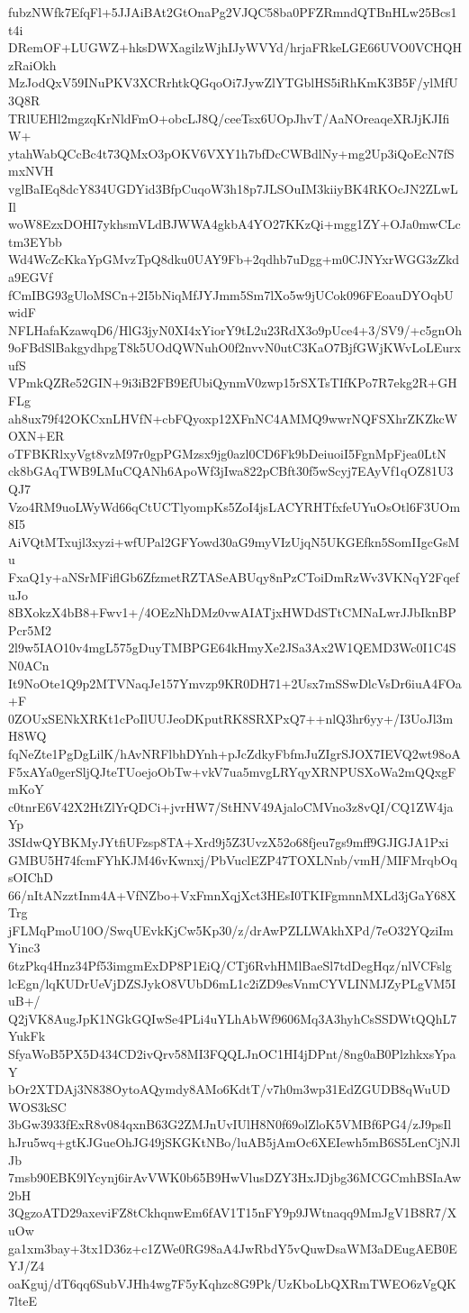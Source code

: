 fubzNWfk7EfqFl+5JJAiBAt2GtOnaPg2VJQC58ba0PFZRmndQTBnHLw25Bcs1t4i
DRemOF+LUGWZ+hksDWXagilzWjhIJyWVYd/hrjaFRkeLGE66UVO0VCHQHzRaiOkh
MzJodQxV59INuPKV3XCRrhtkQGqoOi7JywZlYTGblHS5iRhKmK3B5F/ylMfU3Q8R
TRlUEHl2mgzqKrNldFmO+obcLJ8Q/ceeTsx6UOpJhvT/AaNOreaqeXRJjKJIfiW+
ytahWabQCcBc4t73QMxO3pOKV6VXY1h7bfDcCWBdlNy+mg2Up3iQoEcN7fSmxNVH
vglBaIEq8dcY834UGDYid3BfpCuqoW3h18p7JLSOuIM3kiiyBK4RKOcJN2ZLwLIl
woW8EzxDOHI7ykhsmVLdBJWWA4gkbA4YO27KKzQi+mgg1ZY+OJa0mwCLctm3EYbb
Wd4WcZcKkaYpGMvzTpQ8dku0UAY9Fb+2qdhb7uDgg+m0CJNYxrWGG3zZkda9EGVf
fCmIBG93gUloMSCn+2I5bNiqMfJYJmm5Sm7lXo5w9jUCok096FEoauDYOqbUwidF
NFLHafaKzawqD6/HlG3jyN0XI4xYiorY9tL2u23RdX3o9pUce4+3/SV9/+c5gnOh
9oFBdSlBakgydhpgT8k5UOdQWNuhO0f2nvvN0utC3KaO7BjfGWjKWvLoLEurxufS
VPmkQZRe52GIN+9i3iB2FB9EfUbiQynmV0zwp15rSXTsTIfKPo7R7ekg2R+GHFLg
ah8ux79f42OKCxnLHVfN+cbFQyoxp12XFnNC4AMMQ9wwrNQFSXhrZKZkcWOXN+ER
oTFBKRlxyVgt8vzM97r0gpPGMzsx9jg0azl0CD6Fk9bDeiuoiI5FgnMpFjea0LtN
ck8bGAqTWB9LMuCQANh6ApoWf3jIwa822pCBft30f5wScyj7EAyVf1qOZ81U3QJ7
Vzo4RM9uoLWyWd66qCtUCTlyompKs5ZoI4jsLACYRHTfxfeUYuOsOtl6F3UOm8I5
AiVQtMTxujl3xyzi+wfUPal2GFYowd30aG9myVIzUjqN5UKGEfkn5SomIIgcGsMu
FxaQ1y+aNSrMFiflGb6ZfzmetRZTASeABUqy8nPzCToiDmRzWv3VKNqY2FqefuJo
8BXokzX4bB8+Fwv1+/4OEzNhDMz0vwAIATjxHWDdSTtCMNaLwrJJbIknBPPcr5M2
2l9w5IAO10v4mgL575gDuyTMBPGE64kHmyXe2JSa3Ax2W1QEMD3Wc0I1C4SN0ACn
It9NoOte1Q9p2MTVNaqJe157Ymvzp9KR0DH71+2Usx7mSSwDlcVsDr6iuA4FOa+F
0ZOUxSENkXRKt1cPoIlUUJeoDKputRK8SRXPxQ7++nlQ3hr6yy+/I3UoJl3mH8WQ
fqNeZte1PgDgLilK/hAvNRFlbhDYnh+pJcZdkyFbfmJuZIgrSJOX7IEVQ2wt98oA
F5xAYa0gerSljQJteTUoejoObTw+vkV7ua5mvgLRYqyXRNPUSXoWa2mQQxgFmKoY
c0tnrE6V42X2HtZlYrQDCi+jvrHW7/StHNV49AjaloCMVno3z8vQI/CQ1ZW4jaYp
3SIdwQYBKMyJYtfiUFzsp8TA+Xrd9j5Z3UvzX52o68fjeu7gs9mff9GJIGJA1Pxi
GMBU5H74fcmFYhKJM46vKwnxj/PbVuclEZP47TOXLNnb/vmH/MIFMrqbOqsOIChD
66/nItANzztInm4A+VfNZbo+VxFmnXqjXct3HEsI0TKIFgmnnMXLd3jGaY68XTrg
jFLMqPmoU10O/SwqUEvkKjCw5Kp30/z/drAwPZLLWAkhXPd/7eO32YQziImYinc3
6tzPkq4Hnz34Pf53imgmExDP8P1EiQ/CTj6RvhHMlBaeSl7tdDegHqz/nlVCFslg
lcEgn/lqKUDrUeVjDZSJykO8VUbD6mL1c2iZD9esVnmCYVLINMJZyPLgVM5IuB+/
Q2jVK8AugJpK1NGkGQIwSe4PLi4uYLhAbWf9606Mq3A3hyhCsSSDWtQQhL7YukFk
SfyaWoB5PX5D434CD2ivQrv58MI3FQQLJnOC1HI4jDPnt/8ng0aB0PlzhkxsYpaY
bOr2XTDAj3N838OytoAQymdy8AMo6KdtT/v7h0m3wp31EdZGUDB8qWuUDWOS3kSC
3bGw3933fExR8v084qxnB63G2ZMJnUvIUlH8N0f69olZloK5VMBf6PG4/zJ9psIl
hJru5wq+gtKJGueOhJG49jSKGKtNBo/luAB5jAmOc6XEIewh5mB6S5LenCjNJlJb
7msb90EBK9lYcynj6irAvVWK0b65B9HwVlusDZY3HxJDjbg36MCGCmhBSIaAw2bH
3QgzoATD29axeviFZ8tCkhqnwEm6fAV1T15nFY9p9JWtnaqq9MmJgV1B8R7/XuOw
ga1xm3bay+3tx1D36z+c1ZWe0RG98aA4JwRbdY5vQuwDsaWM3aDEugAEB0EYJ/Z4
oaKguj/dT6qq6SubVJHh4wg7F5yKqhzc8G9Pk/UzKboLbQXRmTWEO6zVgQK7lteE

